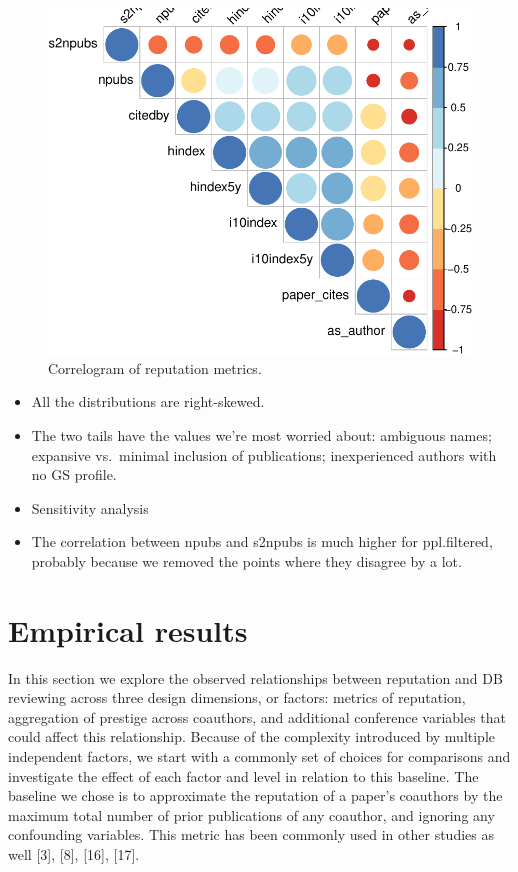 \documentclass[12pt]{article}
\providecommand{\tightlist}{%
  \setlength{\itemsep}{0pt}\setlength{\parskip}{0pt}}
\begin{document}
\begin{figure}
\centering
\includegraphics{prestige_files/figure-latex/metric-corrs-2.pdf}
\caption{\label{fig:metric-corrs-2}Correlogram of reputation metrics.}
\end{figure}

\begin{itemize}
\tightlist
\item
  All the distributions are right-skewed.
\item
  The two tails have the values we're most worried about: ambiguous names; expansive vs.~minimal inclusion of publications; inexperienced authors with no GS profile.
\item
  Sensitivity analysis
\item
  The correlation between npubs and s2npubs is much higher for ppl.filtered, probably because we removed the points where they disagree by a lot.
\end{itemize}

\hypertarget{sec:results}{%
\section{Empirical results}\label{sec:results}}

In this section we explore the observed relationships between reputation and DB reviewing across three design dimensions, or factors: metrics of reputation, aggregation of prestige across coauthors, and additional conference variables that could affect this relationship. Because of the complexity introduced by multiple independent factors, we start with a commonly set of choices for comparisons and investigate the effect of each factor and level in relation to this baseline. The baseline we chose is to approximate the reputation of a paper's coauthors by the maximum total number of prior publications of any coauthor, and ignoring any confounding variables. This metric has been commonly used in other studies as well {[}3{]}, {[}8{]}, {[}16{]}, {[}17{]}.
\end{document}
